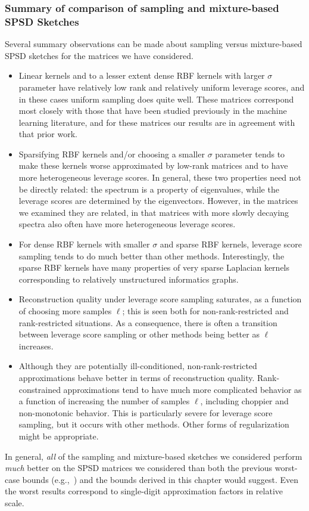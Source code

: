 \subsubsection{Summary of comparison of sampling and mixture-based SPSD Sketches}

Several summary observations can be made about sampling versus mixture-based SPSD sketches
for the matrices we have considered.
\begin{itemize}
\item
Linear kernels and to a lesser extent dense RBF kernels with larger $\sigma$
parameter have relatively low rank and relatively uniform leverage scores, 
and in these cases uniform sampling does quite well.
These matrices correspond most closely with those that have been studied 
previously in the machine learning literature, and for these matrices our 
results are in agreement with that prior work.
\item
Sparsifying RBF kernels and/or choosing a smaller $\sigma$ parameter tends
to make these kernels worse approximated by low-rank matrices and to 
have more heterogeneous leverage scores.
In general, these two properties need not be directly related: the spectrum is 
a property of eigenvalues, while the leverage scores are determined by the 
eigenvectors. However, in the matrices we examined they are related, in that 
matrices with more slowly decaying spectra also often have more 
heterogeneous leverage scores.
\item
For dense RBF kernels with smaller $\sigma$ and sparse RBF kernels, leverage 
score sampling tends to do much better than other methods.
Interestingly, the sparse RBF kernels have many properties of very sparse 
Laplacian kernels corresponding to relatively unstructured informatics 
graphs.

\item
Reconstruction quality under leverage score sampling saturates, as a 
function of choosing more samples $\ell$; this is seen both for 
non-rank-restricted and rank-restricted situations.
As a consequence, there is often a transition between leverage score sampling
or other methods being better as $\ell$ increases.
\item
Although they are potentially ill-conditioned, non-rank-restricted approximations 
behave better in terms of reconstruction quality.
Rank-constrained approximations tend to have much more complicated behavior
as a function of increasing the number of samples $\ell$, including choppier
and non-monotonic behavior.
This is particularly severe for leverage score sampling, but it occurs with
other methods. Other forms of regularization might be appropriate.
\end{itemize}
In general, \emph{all} of the sampling and mixture-based sketches we considered 
perform \emph{much} better on the SPSD matrices we considered than both the previous
worst-case bounds (e.g.,~\cite{DM05,KMT12}) 
and the bounds derived in this chapter would suggest.
Even the worst results correspond to single-digit approximation 
factors in relative scale.

